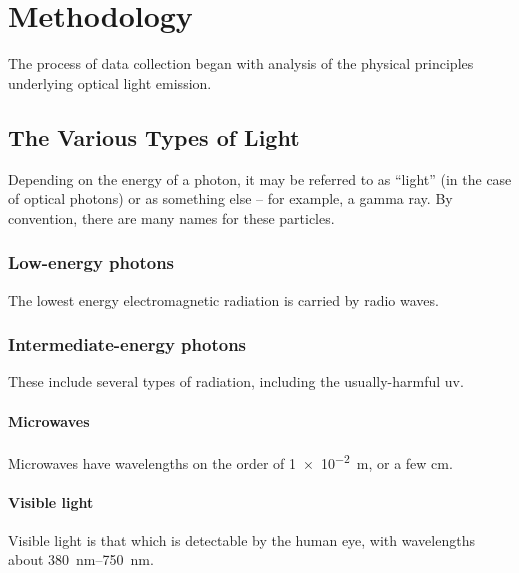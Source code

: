 
\chapter{Methodology}

The process of data collection began with analysis of the physical principles underlying optical light emission.

\section{The Various Types of Light}

Depending on the energy of a photon, it may be referred to as ``light'' (in the case of optical photons) or as something else -- for example, a gamma ray. By convention, there are many names for these particles.

\subsection{Low-energy photons}

The lowest energy electromagnetic radiation is carried by radio waves.

\subsection{Intermediate-energy photons}

These include several types of radiation, including the usually-harmful \gls{uv}.

\subsubsection{Microwaves}

Microwaves have wavelengths on the order of \SI{1e-2}{\meter}, or a few \si{\centi\meter}.

\subsubsection{Visible light}

Visible light is that which is detectable by the human eye, with wavelengths about \SIrange{380}{750}{\nano\meter}.

